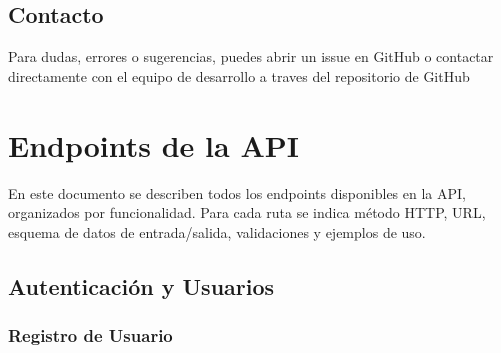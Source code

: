 \documentclass[letterpaper,10pt,spanish]{sphinxmanual}
\begin{document}
\section{Contacto}
\label{\detokenize{introduccion:contacto}}
\sphinxAtStartPar
Para dudas, errores o sugerencias, puedes abrir un issue en GitHub o contactar directamente con el equipo de desarrollo a traves del repositorio de GitHub

\sphinxstepscope


\chapter{Endpoints de la API}
\label{\detokenize{endpoints:endpoints-de-la-api}}\label{\detokenize{endpoints::doc}}
\sphinxAtStartPar
En este documento se describen todos los endpoints disponibles en la API, organizados por funcionalidad. Para cada ruta se indica método HTTP, URL, esquema de datos de entrada/salida, validaciones y ejemplos de uso.


\section{Autenticación y Usuarios}
\label{\detokenize{endpoints:autenticacion-y-usuarios}}

\subsection{Registro de Usuario}
\label{\detokenize{endpoints:registro-de-usuario}}
\end{document}
